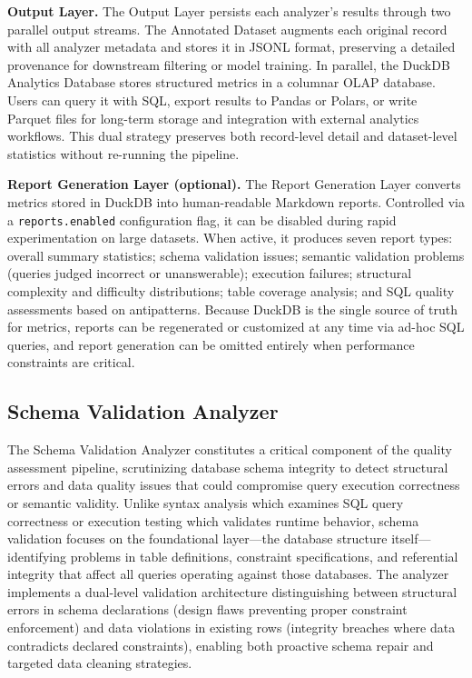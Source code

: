 \documentclass[print]{einformatica}
\begin{document}
\textbf{Output Layer.} The Output Layer persists each analyzer's results through two parallel output streams. The Annotated Dataset augments each original record with all analyzer metadata and stores it in JSONL format, preserving a detailed provenance for downstream filtering or model training. In parallel, the DuckDB Analytics Database stores structured metrics in a columnar OLAP database. Users can query it with SQL, export results to Pandas or Polars, or write Parquet files for long-term storage and integration with external analytics workflows. This dual strategy preserves both record-level detail and dataset-level statistics without re-running the pipeline.

\textbf{Report Generation Layer (optional).} The Report Generation Layer converts metrics stored in DuckDB into human-readable Markdown reports. Controlled via a \texttt{reports.enabled} configuration flag, it can be disabled during rapid experimentation on large datasets. When active, it produces seven report types: overall summary statistics; schema validation issues; semantic validation problems (queries judged incorrect or unanswerable); execution failures; structural complexity and difficulty distributions; table coverage analysis; and SQL quality assessments based on antipatterns. Because DuckDB is the single source of truth for metrics, reports can be regenerated or customized at any time via ad-hoc SQL queries, and report generation can be omitted entirely when performance constraints are critical.

\subsection{Schema Validation Analyzer}\label{sec:schema_analyzer}

The Schema Validation Analyzer constitutes a critical component of the quality assessment pipeline, scrutinizing database schema integrity to detect structural errors and data quality issues that could compromise query execution correctness or semantic validity. Unlike syntax analysis which examines SQL query correctness or execution testing which validates runtime behavior, schema validation focuses on the foundational layer---the database structure itself---identifying problems in table definitions, constraint specifications, and referential integrity that affect all queries operating against those databases. The analyzer implements a dual-level validation architecture distinguishing between structural errors in schema declarations (design flaws preventing proper constraint enforcement) and data violations in existing rows (integrity breaches where data contradicts declared constraints), enabling both proactive schema repair and targeted data cleaning strategies.
\end{document}
